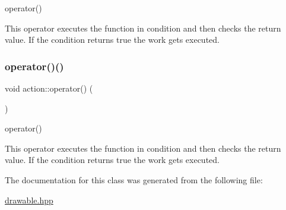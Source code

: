 operator() 

This operator executes the function in condition and then checks the return value. If the condition returns true the work gets executed. \mbox{\label{classaction_a92c003677656b5b3e6e58b19376e6b04}} 
\subsubsection{\texorpdfstring{operator()()}{operator()()}\hspace{0.1cm}{\footnotesize\ttfamily [2/2]}}
{\footnotesize\ttfamily void action\+::operator() (\begin{DoxyParamCaption}{ }\end{DoxyParamCaption})\hspace{0.3cm}{\ttfamily [inline]}}



operator() 

This operator executes the function in condition and then checks the return value. If the condition returns true the work gets executed. 

The documentation for this class was generated from the following file\+:\begin{DoxyCompactItemize}
\item 
\hyperlink{drawable_8hpp}{drawable.\+hpp}\end{DoxyCompactItemize}
